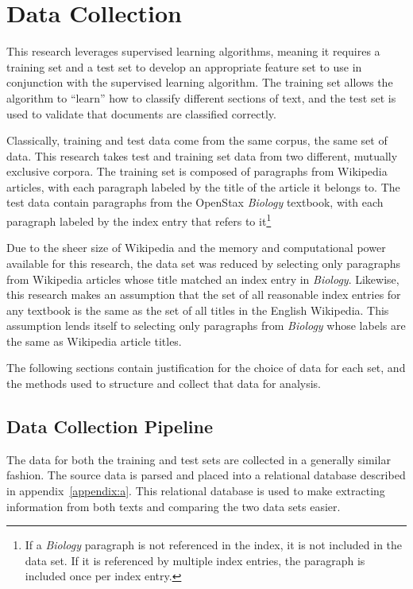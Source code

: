 \section{Data Collection}
\label{sec:data-collection}

This research leverages supervised learning algorithms, meaning it requires a training set and a test set to develop an appropriate feature set to use in conjunction with the supervised learning algorithm.
The training set allows the algorithm to ``learn'' how to classify different sections of text, and the test set is used to validate that documents are classified correctly.

Classically, training and test data come from the same corpus, the same set of data\cite{jurafsky}.
This research takes test and training set data from two different, mutually exclusive corpora.
The training set is composed of paragraphs from Wikipedia articles, with each paragraph labeled by the title of the article it belongs to.
The test data contain paragraphs from the OpenStax {\it Biology} textbook\cite{biology}, with each paragraph labeled by the index entry that refers to it\footnote{If a {\it Biology} paragraph is not referenced in the index, it is not included in the data set. If it is referenced by multiple index entries, the paragraph is included once per index entry.}

Due to the sheer size of Wikipedia and the memory and computational power available for this research, the data set was reduced by selecting only paragraphs from Wikipedia articles whose title matched an index entry in {\it Biology}.
Likewise, this research makes an assumption that the set of all reasonable index entries for any textbook is the same as the set of all titles in the English Wikipedia.
This assumption lends itself to selecting only paragraphs from {\it Biology} whose labels are the same as Wikipedia article titles.

The following sections contain justification for the choice of data for each set, and the methods used to structure and collect that data for analysis.

\subsection{Data Collection Pipeline}

The data for both the training and test sets are collected in a generally similar fashion.
The source data is parsed and placed into a relational database described in appendix~\ref{appendix:a}.
This relational database is used to make extracting information from both texts and comparing the two data sets easier.

